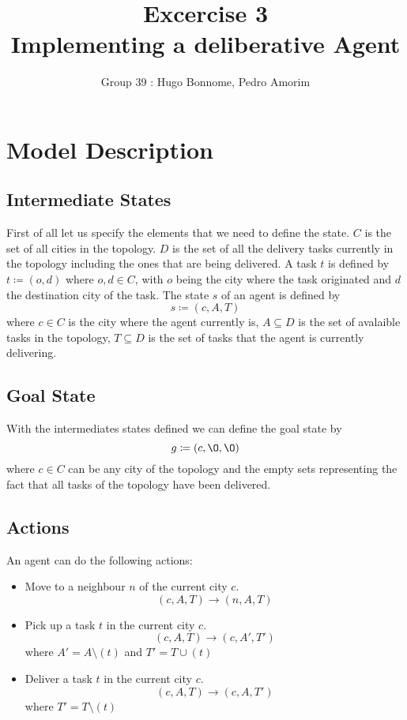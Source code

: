 \documentclass[11pt]{article}
\title{\bf Excercise 3\\ Implementing a deliberative Agent}
\author{Group 39 : Hugo Bonnome, Pedro Amorim}
\begin{document}
\maketitle

\section{Model Description}

\subsection{Intermediate States}
First of all let us specify the elements that we need to define the state.
$ C $ is the set of all cities in the topology. $ D $ is the set of all the
delivery tasks currently in the topology including the ones that are being
delivered.
A task $ t $ is defined by $ t
\coloneqq (o, d) $ where $ o, d \in C $, with $ o $ being the city where the
task originated and $ d $ the destination city of the task.
The state $ s $ of an agent is defined by $$ s \coloneqq (c, A, T) $$ where $c
\in C$ is the city where the agent currently is, $ A \subseteq D $ is the set of
avalaible tasks in the topology, $ T \subseteq D $ is the set of tasks that the
agent is currently delivering.

\subsection{Goal State}
With the intermediates states defined we can define the goal state by $$ g
\coloneqq (c, \O, \O) $$ where $ c \in C $ can be any city of the topology and
the empty sets representing the fact that all tasks of the topology have been
delivered.

\subsection{Actions}
An agent can do the following actions:
\begin{itemize}
\item Move to a neighbour $ n $ of the current city $ c $. $$ (c, A, T)
\rightarrow (n, A, T) $$
\item Pick up a task $ t $ in the current city $ c $. $$ (c, A, T) \rightarrow
  (c, A', T') $$ where $ A' = A \setminus (t) $ and $ T' = T \cup (t) $
\item Deliver a task $ t $ in the current city $ c $. $$ (c, A, T) \rightarrow
  (c, A, T') $$ where $ T' = T \setminus (t) $
\end{itemize}
\end{document}
